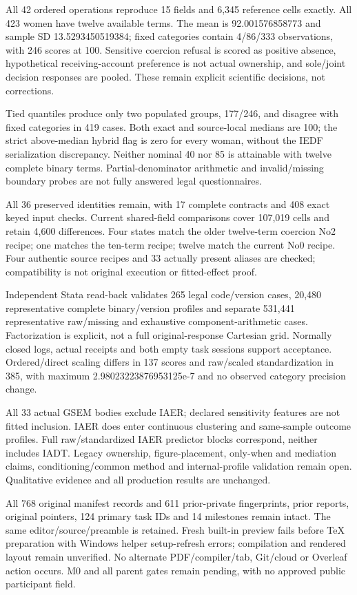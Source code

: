 \documentclass[11pt,a4paper]{article}
\begin{document}
All 42 ordered operations reproduce 15 fields and 6,345 reference cells
exactly. All 423 women have twelve available terms. The mean is
92.001576858773 and sample SD 13.5293450519384; fixed categories contain
4/86/333 observations, with 246 scores at 100. Sensitive coercion
refusal is scored as positive absence, hypothetical receiving-account
preference is not actual ownership, and sole/joint decision responses
are pooled. These remain explicit scientific decisions, not corrections.

Tied quantiles produce only two populated groups, 177/246, and disagree
with fixed categories in 419 cases. Both exact and source-local medians
are 100; the strict above-median hybrid flag is zero for every woman,
without the IEDF serialization discrepancy. Neither nominal 40 nor 85
is attainable with twelve complete binary terms. Partial-denominator
arithmetic and invalid/missing boundary probes are not fully answered
legal questionnaires.

All 36 preserved identities remain, with 17 complete contracts and
408 exact keyed input checks. Current shared-field comparisons cover
107,019 cells and retain 4,600 differences. Four states match the
older twelve-term coercion No2 recipe; one matches the ten-term
recipe; twelve match the current No0 recipe. Four authentic source
recipes and 33 actually present aliases are checked; compatibility is
not original execution or fitted-effect proof.

Independent Stata read-back validates 265 legal code/version cases,
20,480 representative complete binary/version profiles and separate
531,441 representative raw/missing and exhaustive component-arithmetic
cases. Factorization is explicit, not a full original-response
Cartesian grid. Normally closed logs, actual receipts and both empty
task sessions support acceptance. Ordered/direct scaling differs in
137 scores and raw/scaled standardization in 385, with maximum
2.98023223876953125e-7 and no observed category precision change.

All 33 actual GSEM bodies exclude IAER; declared sensitivity features
are not fitted inclusion. IAER does enter continuous clustering and
same-sample outcome profiles. Full raw/standardized IAER predictor
blocks correspond, neither includes IADT. Legacy ownership,
figure-placement, only-when and mediation claims, conditioning/common
method and internal-profile validation remain open. Qualitative
evidence and all production results are unchanged.

All 768 original manifest records and 611 prior-private fingerprints,
prior reports, original pointers, 124 primary task IDs and 14 milestones
remain intact. The same editor/source/preamble is retained. Fresh
built-in preview fails before TeX preparation with Windows helper
setup-refresh errors; compilation and rendered layout remain
unverified. No alternate PDF/compiler/tab,
Git/cloud or Overleaf action occurs. M0 and all parent gates remain
pending, with no approved public participant field.
\end{document}
